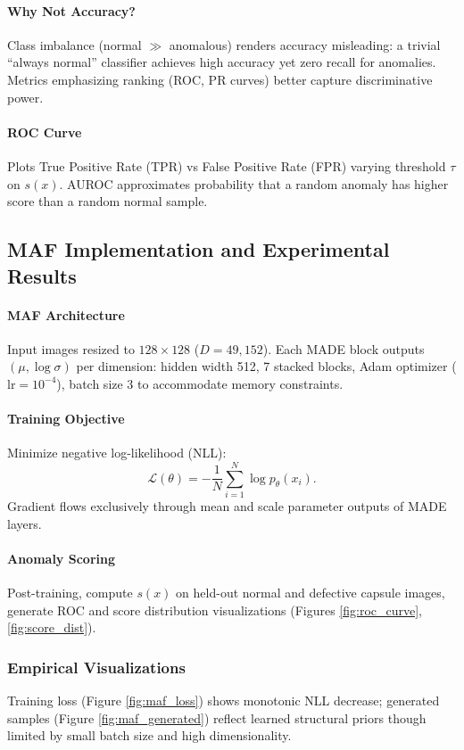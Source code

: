 \documentclass[conference]{IEEEtran}
\begin{document}
\paragraph{Why Not Accuracy?} Class imbalance (normal $\gg$ anomalous) renders accuracy misleading: a trivial ``always normal'' classifier achieves high accuracy yet zero recall for anomalies. Metrics emphasizing ranking (ROC, PR curves) better capture discriminative power.

\paragraph{ROC Curve} Plots True Positive Rate (TPR) vs False Positive Rate (FPR) varying threshold $\tau$ on $s(x)$. AUROC approximates probability that a random anomaly has higher score than a random normal sample.

\subsection{MAF Implementation and Experimental Results}
\paragraph{MAF Architecture} Input images resized to $128\times128$ ($D=49{,}152$). Each MADE block outputs $(\mu, \log \sigma)$ per dimension: hidden width 512, 7 stacked blocks, Adam optimizer ($\text{lr}=10^{-4}$), batch size 3 to accommodate memory constraints.

\paragraph{Training Objective} Minimize negative log-likelihood (NLL):
\begin{equation}
 \mathcal{L}(\theta) = -\frac{1}{N}\sum_{i=1}^{N} \log p_{\theta}(x_i).
\end{equation}
Gradient flows exclusively through mean and scale parameter outputs of MADE layers.

\paragraph{Anomaly Scoring} Post-training, compute $s(x)$ on held-out normal and defective capsule images, generate ROC and score distribution visualizations (Figures \ref{fig:roc_curve}, \ref{fig:score_dist}).

\subsubsection{Empirical Visualizations}
Training loss (Figure \ref{fig:maf_loss}) shows monotonic NLL decrease; generated samples (Figure \ref{fig:maf_generated}) reflect learned structural priors though limited by small batch size and high dimensionality.
\end{document}
